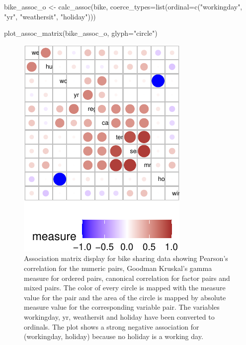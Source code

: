 \begin{Schunk}
\begin{Sinput}
bike_assoc_o <- calc_assoc(bike, 
                           coerce_types=list(ordinal=c("workingday", 
                                                       "yr", 
                                                       "weathersit", 
                                                       "holiday")))

plot_assoc_matrix(bike_assoc_o,
                  glyph="circle")
\end{Sinput}
\begin{figure}

{\centering \includegraphics{rj_paper_files/figure-latex/coerce_types_display-1} 

}

\caption[Association matrix display for bike sharing data showing Pearson's correlation for the numeric pairs, Goodman Kruskal's gamma measure for ordered pairs, canonical correlation for factor pairs and mixed pairs]{Association matrix display for bike sharing data showing Pearson's correlation for the numeric pairs, Goodman Kruskal's gamma measure for ordered pairs, canonical correlation for factor pairs and mixed pairs. The color of every circle is mapped with the measure value for the pair and the area of the circle is mapped by absolute measure value for the corresponding variable pair. The variables workingday, yr, weathersit and holiday have been converted to ordinals. The plot shows a strong negative association for (workingday, holiday) because no holiday is a working day.}\label{fig:coerce_types_display}
\end{figure}
\end{Schunk}

